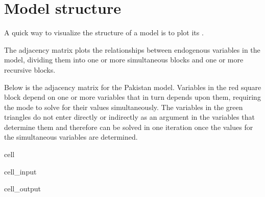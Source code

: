 \documentclass[letterpaper,10pt,english]{jupyterBook}
\begin{document}
\section{Model structure}
\label{\detokenize{content/06_ModelAnalytics/ModelStructure:model-structure}}
\sphinxAtStartPar
A quick way to visualize the structure of a model is to plot its .

\sphinxAtStartPar
The adjacency matrix plots the relationships between endogenous variables in the model, dividing them into one or more simultaneous blocks and one or more recursive blocks.

\sphinxAtStartPar
Below is the adjacency matrix for the Pakistan model. Variables in the red square block depend on one or more variables that in turn depends upon them, requiring the mode to solve for their values simultaneously.  The variables in the green triangles do not enter directly or indirectly as an argument in the variables that determine them and therefore can be solved in one iteration once the values for the simultaneous variables are determined.

\begin{sphinxuseclass}{cell}\begin{sphinxVerbatimInput}

\begin{sphinxuseclass}{cell_input}
\begin{sphinxVerbatim}[commandchars=\\\{\}]
\end{sphinxVerbatim}

\end{sphinxuseclass}\end{sphinxVerbatimInput}
\begin{sphinxVerbatimOutput}

\begin{sphinxuseclass}{cell_output}
\noindent{}

\end{sphinxuseclass}\end{sphinxVerbatimOutput}

\end{sphinxuseclass}
\end{document}
